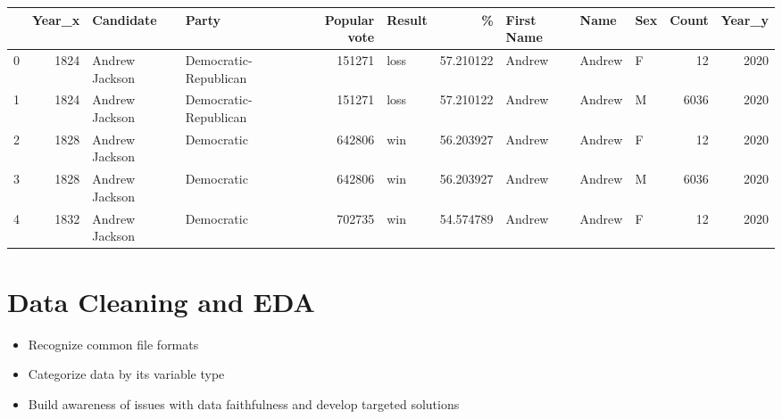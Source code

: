 \documentclass[
  letterpaper,
  DIV=11,
  numbers=noendperiod]{scrreprt}
\providecommand{\tightlist}{%
  \setlength{\itemsep}{0pt}\setlength{\parskip}{0pt}}\usepackage{longtable,booktabs,array}
\begin{document}
\begin{tabular}{lrllrlrlllrr}
\toprule
{} &  Year\_x &       Candidate &                  Party &  Popular vote & Result &          \% & First Name &    Name & Sex &  Count &  Year\_y \\
\midrule
0 &    1824 &  Andrew Jackson &  Democratic-Republican &        151271 &   loss &  57.210122 &     Andrew &  Andrew &   F &     12 &    2020 \\
1 &    1824 &  Andrew Jackson &  Democratic-Republican &        151271 &   loss &  57.210122 &     Andrew &  Andrew &   M &   6036 &    2020 \\
2 &    1828 &  Andrew Jackson &             Democratic &        642806 &    win &  56.203927 &     Andrew &  Andrew &   F &     12 &    2020 \\
3 &    1828 &  Andrew Jackson &             Democratic &        642806 &    win &  56.203927 &     Andrew &  Andrew &   M &   6036 &    2020 \\
4 &    1832 &  Andrew Jackson &             Democratic &        702735 &    win &  54.574789 &     Andrew &  Andrew &   F &     12 &    2020 \\
\bottomrule
\end{tabular}


\hypertarget{data-cleaning-and-eda}{%
\chapter{Data Cleaning and EDA}\label{data-cleaning-and-eda}}

\begin{tcolorbox}[enhanced jigsaw, rightrule=.15mm, opacityback=0, colbacktitle=quarto-callout-note-color!10!white, opacitybacktitle=0.6, coltitle=black, toptitle=1mm, colback=white, toprule=.15mm, leftrule=.75mm, breakable, bottomtitle=1mm, bottomrule=.15mm, arc=.35mm, title=\textcolor{quarto-callout-note-color}{\faInfo}\hspace{0.5em}{Note}, colframe=quarto-callout-note-color-frame, titlerule=0mm, left=2mm]

\begin{itemize}
\tightlist
\item
  Recognize common file formats
\item
  Categorize data by its variable type
\item
  Build awareness of issues with data faithfulness and develop targeted
  solutions
\end{itemize}

\end{tcolorbox}
\end{document}

